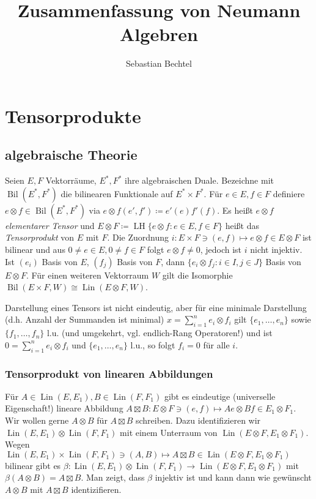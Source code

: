 \documentclass[11pt,a4paper]{scrartcl}
\theoremstyle{plain}
\theoremstyle{definition}
\theoremstyle{remark}
\DeclareMathOperator{\Bil}{Bil}
\DeclareMathOperator{\Lin}{Lin}
\DeclareMathOperator{\LH}{LH}
\begin{document}
\title{Zusammenfassung von Neumann Algebren}
\author{Sebastian Bechtel}
\maketitle

\section{Tensorprodukte}

\subsection{algebraische Theorie}

Seien $E,F$ Vektorräume, $E^*,F^*$ ihre algebraischen Duale. Bezeichne mit $\Bil(E^*,F^*)$ die bilinearen Funktionale auf $E^*\times F^*$. Für $e\in E, f\in F$ definiere $e\otimes f\in \Bil(E^*, F^*)$ via $e\otimes f(e',f')\coloneqq e'(e)f'(f)$. Es heißt $e\otimes f$ \emph{elementarer Tensor} und $E\otimes F\coloneqq \LH \{e\otimes f: e\in E, f\in F\}$ heißt das \emph{Tensorprodukt} von $E$ mit $F$. Die Zuordnung $i: E\times F \ni (e,f) \mapsto e\otimes f \in E\otimes F$ ist bilinear und aus $0\neq e\in E, 0\neq f\in F$ folgt $e\otimes f \neq 0$, jedoch ist $i$ nicht injektiv. Ist $(e_i)$ Basis von $E$, $(f_j)$ Basis von $F$, dann $\{e_i\otimes f_j: i\in I, j\in J\}$ Basis von $E\otimes F$. Für einen weiteren Vektorraum $W$ gilt die Isomorphie $\Bil(E\times F, W)\cong \Lin(E\otimes F, W)$.

Darstellung eines Tensors ist nicht eindeutig, aber für eine minimale Darstellung (d.h. Anzahl der Summanden ist minimal) $x=\sum_{i=1}^n e_i\otimes f_i$ gilt $\{e_1,\dots,e_n\}$ sowie $\{f_1,\dots,f_n\}$ l.u. (und umgekehrt, vgl. endlich-Rang Operatoren!) und ist $0=\sum_{i=1}^n e_i\otimes f_i$ und $\{e_1,\dots,e_n\}$ l.u., so folgt $f_i=0$ für alle $i$.

\subsubsection{Tensorprodukt von linearen Abbildungen}

Für $A\in \Lin(E,E_1), B\in \Lin(F,F_1)$ gibt es eindeutige (universelle Eigenschaft!) lineare Abbildung $A\boxtimes B: E\otimes F \ni (e,f)\mapsto Ae\otimes Bf \in E_1\otimes F_1$. Wir wollen gerne $A\otimes B$ für $A\boxtimes B$ schreiben. Dazu identifizieren wir $\Lin(E,E_1)\otimes \Lin(F,F_1)$ mit einem Unterraum von $\Lin(E\otimes F, E_1\otimes F_1)$. Wegen $\Lin(E,E_1)\times \Lin(F,F_1) \ni (A,B) \mapsto A\boxtimes B \in \Lin(E\otimes F, E_1\otimes F_1)$ bilinear gibt es $\beta: \Lin(E,E_1)\otimes \Lin(F,F_1) \to \Lin(E\otimes F, E_1\otimes F_1)$ mit $\beta(A\otimes B) = A\boxtimes B$. Man zeigt, dass $\beta$ injektiv ist und kann dann wie gewünscht $A\otimes B$ mit $A\boxtimes B$ identizifieren.
\end{document}
